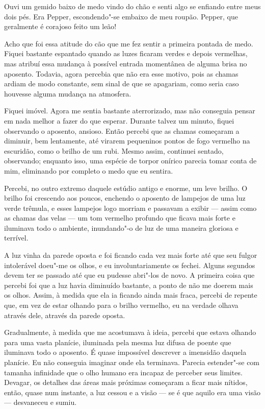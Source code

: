 Ouvi um gemido baixo de medo vindo do chão e senti algo se enfiando entre meus dois pés. Era Pepper, escondendo"-se
embaixo de meu roupão. Pepper, que geralmente é corajoso feito um leão!

Acho que foi essa atitude do cão que me fez sentir a primeira pontada de medo. Fiquei bastante espantado quando as
luzes ficaram verdes e depois vermelhas, mas atribuí essa mudança à possível entrada momentânea de alguma brisa no
aposento. Todavia, agora percebia que não era esse motivo, pois as chamas ardiam de modo constante, sem sinal de que se
apagariam, como seria caso houvesse alguma mudança na atmosfera.

Fiquei imóvel. Agora me sentia bastante aterrorizado, mas não conseguia pensar em nada melhor a fazer do que esperar.
Durante talvez um minuto, fiquei observando o aposento, ansioso. Então percebi que as chamas começaram a
diminuir, bem lentamente, até virarem pequeninos pontos de fogo vermelho na escuridão, como o brilho de um rubi. Mesmo
assim, continuei sentado, observando; enquanto isso, uma espécie de torpor onírico parecia tomar conta de mim,
eliminando por completo o medo que eu sentira.

Percebi, no outro extremo daquele estúdio antigo e enorme, um leve brilho. O brilho foi crescendo aos poucos, enchendo
o aposento de lampejos de uma luz verde trêmula, e esses lampejos logo morriam e passavam a exibir --- assim como as
chamas das velas --- um tom vermelho profundo que ficava mais forte e iluminava todo o ambiente, inundando"-o de luz de
uma maneira gloriosa e terrível.

A luz vinha da parede oposta e foi ficando cada vez mais forte até que seu fulgor intolerável doeu"-me os olhos, e eu
involuntariamente os fechei. Alguns segundos devem ter se passado até que eu pudesse abri"-los de novo. A primeira
coisa que percebi foi que a luz havia diminuído bastante, a ponto de não me doerem mais os olhos. Assim, à medida que
ela ia ficando ainda mais fraca, percebi de repente que, em vez de estar olhando para o brilho vermelho, eu na
verdade olhava através dele, através da parede oposta.

Gradualmente, à medida que me acostumava à ideia, percebi que estava olhando para uma vasta planície, iluminada pela
mesma luz difusa de poente que iluminava todo o aposento. É quase impossível descrever a imensidão daquela planície. Eu
não conseguia imaginar onde ela terminava. Parecia estender"-se com tamanha infinidade que o olho humano era incapaz de
perceber seus limites. Devagar, os detalhes das áreas mais próximas começaram a ficar mais nítidos, então, quase
num instante, a luz cessou e a visão --- se é que aquilo era uma visão --- desvaneceu e sumiu.

